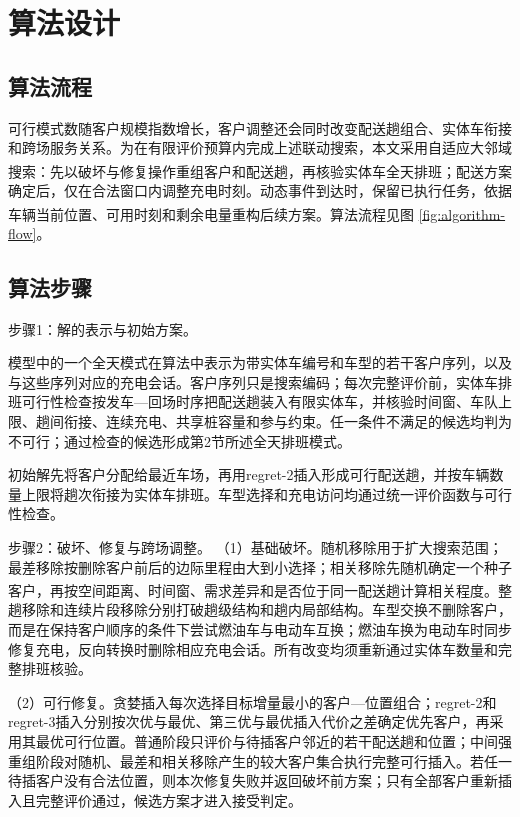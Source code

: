\documentclass{setp-new}
\begin{document}
\section{算法设计}

\subsection{算法流程}
可行模式数随客户规模指数增长，客户调整还会同时改变配送趟组合、实体车衔接和跨场服务关系。为在有限评价预算内完成上述联动搜索，本文采用自适应大邻域搜索\textsuperscript{\cite{ref:66,ref:36}}：先以破坏与修复操作重组客户和配送趟，再核验实体车全天排班；配送方案确定后，仅在合法窗口内调整充电时刻。动态事件到达时，保留已执行任务，依据车辆当前位置、可用时刻和剩余电量重构后续方案\textsuperscript{\cite{ref:51}}。算法流程见图 \ref{fig:algorithm-flow}。



\subsection{算法步骤}

\noindent 步骤1：解的表示与初始方案。

模型中的一个全天模式在算法中表示为带实体车编号和车型的若干客户序列，以及与这些序列对应的充电会话。客户序列只是搜索编码；每次完整评价前，实体车排班可行性检查按发车—回场时序把配送趟装入有限实体车，并核验时间窗、车队上限、趟间衔接、连续充电、共享桩容量和参与约束。任一条件不满足的候选均判为不可行；通过检查的候选形成第2节所述全天排班模式。

初始解先将客户分配给最近车场，再用regret-2插入形成可行配送趟，并按车辆数量上限将趟次衔接为实体车排班。车型选择和充电访问均通过统一评价函数与可行性检查。

\noindent 步骤2：破坏、修复与跨场调整。
（1）基础破坏。随机移除用于扩大搜索范围；最差移除按删除客户前后的边际里程由大到小选择；相关移除先随机确定一个种子客户，再按空间距离、时间窗、需求差异和是否位于同一配送趟计算相关程度\textsuperscript{\cite{ref:67}}。整趟移除和连续片段移除分别打破趟级结构和趟内局部结构。车型交换不删除客户，而是在保持客户顺序的条件下尝试燃油车与电动车互换；燃油车换为电动车时同步修复充电，反向转换时删除相应充电会话。所有改变均须重新通过实体车数量和完整排班核验。

（2）可行修复。贪婪插入每次选择目标增量最小的客户—位置组合；regret-2和regret-3插入分别按次优与最优、第三优与最优插入代价之差确定优先客户，再采用其最优可行位置。普通阶段只评价与待插客户邻近的若干配送趟和位置；中间强重组阶段对随机、最差和相关移除产生的较大客户集合执行完整可行插入。若任一待插客户没有合法位置，则本次修复失败并返回破坏前方案；只有全部客户重新插入且完整评价通过，候选方案才进入接受判定。
\end{document}
